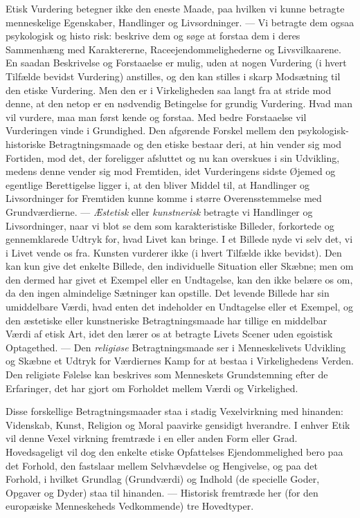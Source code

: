 \documentclass[12pt,a4paper,openany]{book}
\newcommand{\opage}[1]{\marginnote{\footnotesize\textit{[#1]}}}
\begin{document}
Etisk Vurdering betegner ikke den eneste Maade, paa hvilken
vi kunne betragte menneskelige Egenskaber, Handlinger og
Livsordninger. --- Vi betragte dem ogsaa psykologisk og histo%
\setcounter{footnote}{0}%
\opage{64}risk: beskrive dem og søge at forstaa dem i deres Sammenhæng
med Karaktererne, Raceejendommelighederne og Livsvilkaarene.
En saadan Beskrivelse og Forstaaelse er mulig, uden
at nogen Vurdering (i hvert Tilfælde bevidst Vurdering) anstilles,
og den kan stilles i skarp Modsætning til den etiske Vurdering.
Men den er i Virkeligheden saa langt fra at stride mod denne,
at den netop er en nødvendig Betingelse for grundig Vurdering.
Hvad man vil vurdere, maa man først kende og forstaa. Med
bedre Forstaaelse vil Vurderingen vinde i Grundighed. Den afgørende
Forskel mellem den psykologisk-historiske Betragtningsmaade
og den etiske bestaar deri, at hin vender sig mod Fortiden,
mod det, der foreligger afsluttet og nu kan overskues i
sin Udvikling, medens denne vender sig mod Fremtiden, idet
Vurderingens sidste Øjemed og egentlige Berettigelse ligger i,
at den bliver Middel til, at Handlinger og Livsordninger for
Fremtiden kunne komme i større Overensstemmelse med Grundværdierne.
--- \textit{Æstetisk} eller \textit{kunstnerisk} betragte vi Handlinger
og Livsordninger, naar vi blot se dem som karakteristiske Billeder,
forkortede og gennemklarede Udtryk for, hvad Livet kan
bringe. I et Billede nyde vi selv det, vi i Livet vende os fra.
Kunsten vurderer ikke (i hvert Tilfælde ikke bevidst). Den kan
kun give det enkelte Billede, den individuelle Situation eller
Skæbne; men om den dermed har givet et Exempel eller en
Undtagelse, kan den ikke belære os om, da den ingen almindelige
Sætninger kan opstille. Det levende Billede har sin umiddelbare
Værdi, hvad enten det indeholder en Undtagelse eller
et Exempel, og den æstetiske eller kunstneriske Betragtningsmaade
har tillige en middelbar Værdi af etisk Art, idet den
lærer os at betragte Livets Scener uden egoistisk Optagethed.
--- Den \textit{religiøse} Betragtningsmaade ser i Menneskelivets Udvikling
og Skæbne et Udtryk for Værdiernes Kamp for at bestaa
i Virkelighedens Verden. Den religiøte Følelse kan beskrives
som Menneskets Grundstemning efter de Erfaringer, det har
gjort om Forholdet mellem Værdi og Virkelighed.

Disse forskellige Betragtningsmaader staa i stadig Vexelvirkning
med hinanden: Videnskab, Kunst, Religion og Moral
paavirke gensidigt hverandre. I enhver Etik vil denne Vexel%
\setcounter{footnote}{0}%
\opage{65}virkning fremtræde i en eller anden Form eller Grad. Hovedsageligt
vil dog den enkelte etiske Opfattelses Ejendommelighed
bero paa det Forhold, den fastslaar mellem Selvhævdelse og
Hengivelse, og paa det Forhold, i hvilket Grundlag (Grundværdi)
og Indhold (de specielle Goder, Opgaver og Dyder) staa
til hinanden. --- Historisk fremtræde her (for den europæiske
Menneskeheds Vedkommende) tre Hovedtyper.
\end{document}
